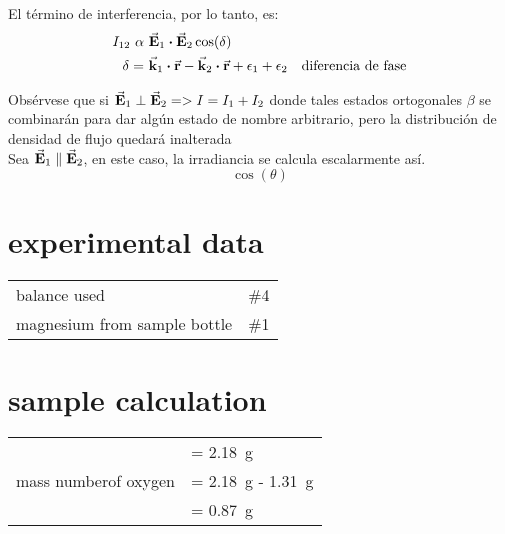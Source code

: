 \documentclass{article}
\begin{document}
  El término de interferencia, por lo tanto, es:
  \begin{equation}
    \label{eq:7}
    \begin{aligned}
      I_{12}\  \alpha\ &\va{E}_1\dotproduct\va{E}_2\cos(\delta)
      \\
      \delta =\ & \va{k}_1\dotproduct\va{r} - \va{k}_2\dotproduct\va{r} + \epsilon_1 + \epsilon_2\ \ \ \text{diferencia de fase}
    \end{aligned}
  \end{equation}
  
  Obsérvese que si $\va{E}_1\perp\va{E}_2 => I = I_1 + I_2$ donde tales estados ortogonales $\beta$ se combinarán para dar algún estado
  de nombre arbitrario, pero la distribución de densidad de flujo quedará
  inalterada
  \\
  Sea $\va{E}_1\parallel \va{E}_2$, en este caso, la irradiancia se calcula escalarmente así.
  \begin{equation}
    \label{eq:8}
    \cos(\theta)
  \end{equation}
  

  \section{experimental data}
\begin{tabular}{|l|l|}
  balance used & \#4\\
  magnesium from sample bottle & \#1
\end{tabular}

\section{sample calculation}

\begin{tabular}{ll}
  & = \SI{2.18}{\gram}\\
  mass numberof oxygen & = \SI{2.18}{\gram} - \SI{1.31}{\gram}\\
  & = \SI{0.87}{\gram}
\end{tabular}
\end{document}
